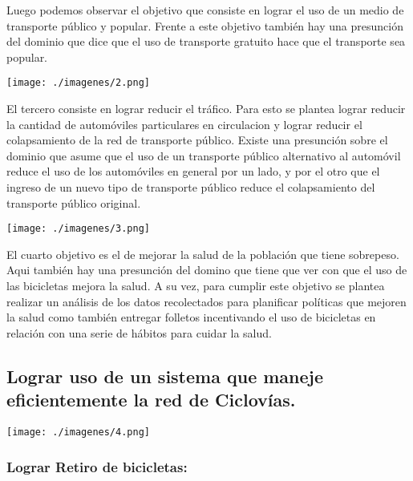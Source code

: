 \documentclass[a4paper, 11pt, spanish]{article}
\begin{document}
Luego podemos observar el objetivo que consiste en lograr el uso de un medio de transporte público y popular. Frente a este objetivo también hay una presunción del dominio que dice que el uso de transporte gratuito hace que el transporte sea popular.\\

\vspace*{0.7cm}
\centerline{\texttt{[image: ./imagenes/2.png]}}
\vspace*{0.7cm}

El tercero consiste en lograr reducir el tráfico. Para esto se plantea lograr reducir la cantidad de automóviles particulares en circulacion y lograr reducir el colapsamiento de
la red de transporte público. Existe una presunción sobre el dominio que asume que el uso de un transporte público alternativo al automóvil reduce el uso de los automóviles en general por un lado, y por el otro que el ingreso de un nuevo tipo de transporte público reduce el colapsamiento del transporte público original.\\

\vspace*{0.7cm}
\centerline{\texttt{[image: ./imagenes/3.png]}}
\vspace*{0.7cm}

El cuarto objetivo es el de mejorar la salud de la población que tiene sobrepeso. Aqui también hay una presunción del domino que tiene que ver con que el uso de las bicicletas mejora la salud. A su vez, para cumplir este objetivo se plantea realizar un análisis de los datos recolectados para planificar políticas que mejoren la salud como también entregar folletos incentivando el uso de bicicletas en relación con una serie de hábitos para cuidar la salud.


\subsection{Lograr uso de un sistema que maneje eficientemente la red de Ciclovías.}

\vspace*{0.7cm}
\centerline{\texttt{[image: ./imagenes/4.png]}}
\vspace*{0.7cm}


\subsubsection{Lograr Retiro de bicicletas:}
\end{document}
